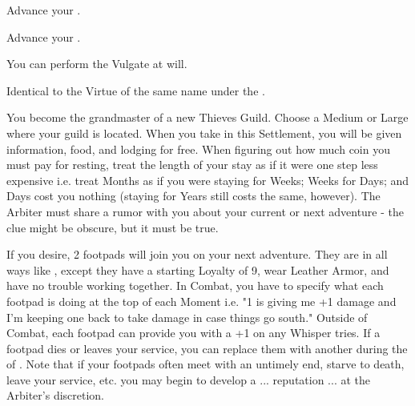 \begin{multicols*}{2}


Advance your  \DCUP.


Advance your  \DCUP.


You can perform the  Vulgate at will.


Identical to the Virtue of the same name under the . 


You become the grandmaster of a new Thieves Guild. Choose a Medium or Large  where your guild is located. When you take  in this Settlement, you will be given information, food, and lodging for free. When figuring out how much coin you must pay for resting, treat the length of your stay as if it were one step less expensive i.e. treat Months as if you were staying for Weeks; Weeks for Days; and Days cost you nothing (staying for Years still costs the same, however). The Arbiter must share a rumor with you about your current or next adventure - the clue might be obscure, but it must be true.

If you desire, 2 footpads will join you on your next adventure.  They are  in all ways like , except they have a starting Loyalty of 9, wear Leather Armor, and have no trouble working together. In Combat, you have to specify what each footpad is doing at the top of each Moment i.e. "1 is giving me +1 damage and I'm keeping one back to take damage in case things go south." Outside of Combat, each footpad can provide you with a +1 on any Whisper tries. If a footpad dies or leaves your service, you can replace them with another during the  of . Note that if your footpads often meet with an untimely end, starve to death, leave your service, etc. you may begin to develop a ... reputation ... at the Arbiter's discretion.


\end{multicols*}
